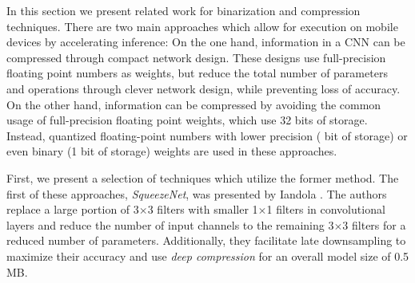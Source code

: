 \documentclass[10pt,twocolumn,letterpaper]{article}
\begin{document}
In this section we present related work for binarization and compression techniques.
There are two main approaches which allow for execution on mobile devices by accelerating inference:
On the one hand, information in a CNN can be compressed through compact network design.
These designs use full-precision floating point numbers as weights, but reduce the total number of parameters and operations through clever network design, while preventing loss of accuracy.
On the other hand, information can be compressed by avoiding the common usage of full-precision floating point weights, which use 32 bits of storage.
Instead, quantized floating-point numbers with lower precision ( bit of storage) or even binary (1 bit of storage) weights are used in these approaches.


First, we present a selection of techniques which utilize the former method.
The first of these approaches, \emph{SqueezeNet}, was presented by Iandola \etal\cite{Iandola2016}.
The authors replace a large portion of 3$\times$3 filters with smaller 1$\times$1 filters in convolutional layers and reduce the number of input channels to the remaining 3$\times$3 filters for a reduced number of parameters.
Additionally, they facilitate late downsampling to maximize their accuracy and use \emph{deep compression}\cite{Han2015} for an overall model size of 0.5 MB.
\end{document}
